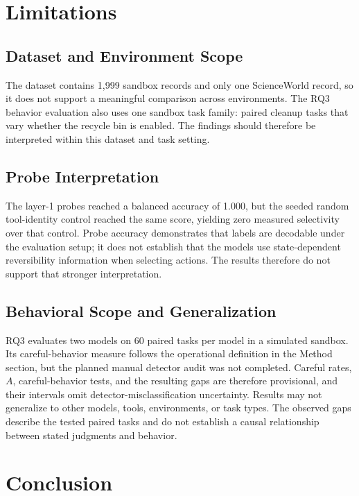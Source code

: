\documentclass[conference]{IEEEtran}
\begin{document}
\section{Limitations}

\subsection{Dataset and Environment Scope}

The dataset contains 1,999 sandbox records and only one ScienceWorld
record, so it does not support a meaningful comparison across
environments. The RQ3 behavior evaluation also uses one sandbox task
family: paired cleanup tasks that vary whether the recycle bin is
enabled. The findings should therefore be interpreted within this
dataset and task setting.

\subsection{Probe Interpretation}

The layer-1 probes reached a balanced accuracy of 1.000, but the
seeded random tool-identity control reached the same score, yielding
zero measured selectivity over that control. Probe accuracy demonstrates
that labels are decodable under the evaluation setup; it does not
establish that the models use state-dependent reversibility
information when selecting actions. The results therefore do not
support that stronger interpretation.

\subsection{Behavioral Scope and Generalization}

RQ3 evaluates two models on 60 paired tasks per model in a simulated
sandbox. Its careful-behavior measure follows the operational
definition in the Method section, but the planned manual detector audit
was not completed. Careful rates, $A$, careful-behavior tests, and the
resulting gaps are therefore provisional, and their intervals omit
detector-misclassification uncertainty. Results may not generalize to
other models, tools, environments, or task types. The observed gaps
describe the tested paired tasks and do not establish a causal
relationship between stated judgments and behavior.

\section{Conclusion}
\end{document}
